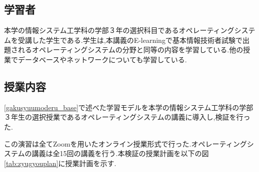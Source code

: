 \documentclass[11pt, a4paper]{jreport}
\begin{document}
\subsection{学習者}

本学の情報システム工学科の学部３年の選択科目であるオペレーティングシステムを受講した学生である.学生は,本講義のE-learningで基本情報技術者試験で出題されるオペレーティングシステムの分野と同等の内容を学習している.他の授業でデータベースやネットワークについても学習している.

\subsection{授業内容}\label{gakusyuunaiyou}

\ref{gakusyuumoderu_base}で述べた学習モデルを本学の情報システム工学科の学部３年生の選択授業であるオペレーティングシステムの講義に導入し,検証を行った.

この演習は全てZoomを用いたオンライン授業形式で行った.オペレーティングシステムの講義は全15回の講義を行う.本検証の授業計画を以下の図\ref{tab:zyugyouplan}に授業計画を示す.
\end{document}
